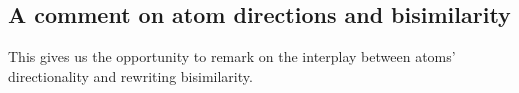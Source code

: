


\subsection{A comment on atom directions and bisimilarity}

This  gives us the opportunity to remark on the interplay between atoms' directionality and rewriting bisimilarity.

